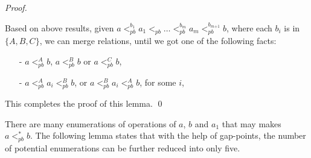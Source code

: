 \begin {proof}
\begin{itemize}
\end{itemize}

Based on above results, given $a <_{\textit{pb}}^{b_1} a_1 <_{\textit{pb}} \ldots <_{\textit{pb}}^{b_m} a_m <_{\textit{pb}}^{b_{\textit{m+1}}} b$, where each $b_i$ is in $\{ A,B,C \}$, we can merge relations, until we got one of the following facts:

\begin{itemize}
\setlength{\itemsep}{0.5pt}
\item[-] $a <_{\textit{pb}}^A b$, $a <_{\textit{pb}}^B b$ or $a <_{\textit{pb}}^C b$,

\item[-] $a <_{\textit{pb}}^A a_i <_{\textit{pb}}^B b$, or $a <_{\textit{pb}}^B a_i <_{\textit{pb}}^A b$, for some $i$,
\end{itemize}

This completes the proof of this lemma. \qed
\end {proof}

There are many enumerations of operations of $a$, $b$ and $a_1$ that may makes $a <_{\textit{pb}}^* b$. The following lemma states that with the help of gap-points, the number of potential enumerations can be further reduced into only five.


